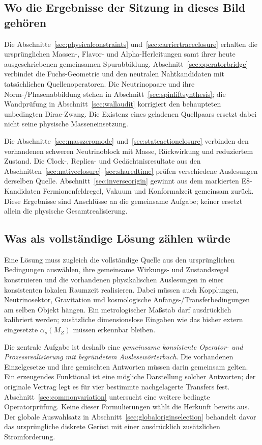 \subsection{Wo die Ergebnisse der Sitzung in dieses Bild gehören}
Die Abschnitte~\ref{sec:physicalconstraints} und~\ref{sec:carriertraceclosure} erhalten die ursprünglichen Massen-, Flavor- und Alpha-Herleitungen samt ihrer heute ausgeschriebenen gemeinsamen Spurabbildung. Abschnitt~\ref{sec:operatorbridge} verbindet die Fuchs-Geometrie und den neutralen Nahtkandidaten mit tatsächlichen Quellenoperatoren. Die Neutrinopaare und ihre Norm-/Phasenabbildung stehen in Abschnitt~\ref{sec:spinliftsynthesis}; die Wandprüfung in Abschnitt~\ref{sec:wallaudit} korrigiert den behaupteten unbedingten Dirac-Zwang. Die Existenz eines geladenen Quellpaars ersetzt dabei nicht seine physische Masseneinsetzung.

Die Abschnitte~\ref{sec:masszeromode} und~\ref{sec:stateactionclosure} verbinden den vorhandenen schweren Neutrinoblock mit Masse, Rückwirkung und reduziertem Zustand. Die Clock-, Replica- und Gedächtnisresultate aus den Abschnitten~\ref{sec:nativeclosure}--\ref{sec:sharedtime} prüfen verschiedene Auslesungen derselben Quelle. Abschnitt~\ref{sec:inverseorigin} gewinnt aus dem markierten E8-Kandidaten Fermionenfeldregel, Vakuum und Konformalzeit gemeinsam zurück. Diese Ergebnisse sind Anschlüsse an die gemeinsame Aufgabe; keiner ersetzt allein die physische Gesamtrealisierung.

\subsection{Was als vollständige Lösung zählen würde}
Eine Lösung muss zugleich die vollständige Quelle aus den ursprünglichen Bedingungen auswählen, ihre gemeinsame Wirkungs- und Zustandsregel konstruieren und die vorhandenen physikalischen Auslesungen in einer konsistenten lokalen Raumzeit realisieren. Dabei müssen auch Kopplungen, Neutrinosektor, Gravitation und kosmologische Anfangs-/Transferbedingungen am selben Objekt hängen. Ein metrologischer Maßstab darf ausdrücklich kalibriert werden; zusätzliche dimensionslose Eingaben wie das bisher extern eingesetzte $\alpha_s(M_Z)$ müssen erkennbar bleiben.

Die zentrale Aufgabe ist deshalb eine \emph{gemeinsame konsistente Operator- und Prozessrealisierung mit begründetem Auslesewörterbuch}. Die vorhandenen Einzelgesetze und ihre gemischten Antworten müssen darin gemeinsam gelten. Ein erzeugendes Funktional ist eine mögliche Darstellung solcher Antworten; der originale Vertrag  legt es für vier bestimmte nachgelagerte Transfers fest. Abschnitt~\ref{sec:commonvariation} untersucht eine weitere bedingte Operatorprüfung. Keine dieser Formulierungen wählt die Herkunft bereits aus. Der globale Auswahlsatz in Abschnitt~\ref{sec:globaloriginselection} behandelt davor das ursprüngliche diskrete Gerüst mit einer ausdrücklich zusätzlichen Stromforderung.

